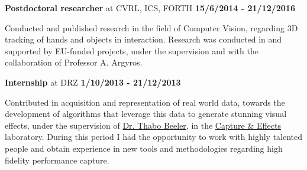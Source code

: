 \documentclass[10pt]{article}
\newenvironment{outerlist}[1][\enskip\textbullet]%
        {\begin{itemize}[#1]}{\end{itemize}%
         \vspace{-.6\baselineskip}}
\newenvironment{innerlist}[1][\enskip\textbullet]%
        {\begin{compactitem}[#1]}{\end{compactitem}}
\begin{document}
\begin{outerlist}
        \item[] \textbf{Postdoctoral researcher} at \ac{CVRL}, \ac{ICS}, \ac{FORTH} \hfill \textbf{15/6/2014 - 21/12/2016}
        \begin{innerlist}
                \item Conducted and published research in the field of Computer Vision, regarding 3D tracking of hands and objects in interaction. Research was conducted in and supported by EU-funded projects, under the supervision and with the collaboration of Professor A. Argyros.
        \end{innerlist}
\item[] \textbf{Internship} at \ac{DRZ} \hfill \textbf{1/10/2013 - 21/12/2013}
        \begin{innerlist}
                \item Contributed in acquisition and representation of real world data, towards the development of algorithms that leverage this data to generate stunning visual effects, under the supervision of \href{mailto:thabo.beeler @disneyresearch.com}{Dr. Thabo Beeler}, in the \href{http://www.disneyresearch.com/research-labs/disney-research-zurich/dr-zurich-capture-effects/}{Capture \& Effects} laboratory. During this period I had the opportunity to work with highly talented people and obtain experience in new tools and methodologies
regarding high fidelity performance capture.        \end{innerlist}


\end{outerlist}
\end{document}
